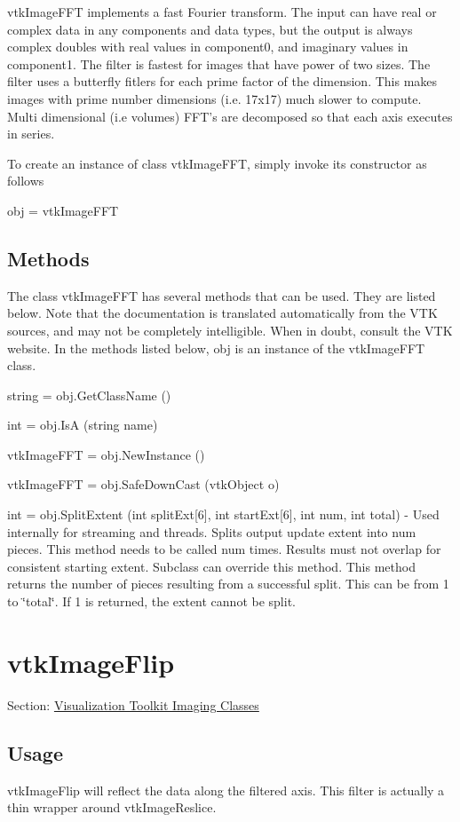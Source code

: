 vtk\-Image\-F\-F\-T implements a fast Fourier transform. The input can have real or complex data in any components and data types, but the output is always complex doubles with real values in component0, and imaginary values in component1. The filter is fastest for images that have power of two sizes. The filter uses a butterfly fitlers for each prime factor of the dimension. This makes images with prime number dimensions (i.\-e. 17x17) much slower to compute. Multi dimensional (i.\-e volumes) F\-F\-T's are decomposed so that each axis executes in series.

To create an instance of class vtk\-Image\-F\-F\-T, simply invoke its constructor as follows \begin{DoxyVerb}  obj = vtkImageFFT
\end{DoxyVerb}
 \hypertarget{vtkwidgets_vtkxyplotwidget_Methods}{}\subsection{Methods}\label{vtkwidgets_vtkxyplotwidget_Methods}
The class vtk\-Image\-F\-F\-T has several methods that can be used. They are listed below. Note that the documentation is translated automatically from the V\-T\-K sources, and may not be completely intelligible. When in doubt, consult the V\-T\-K website. In the methods listed below, {\ttfamily obj} is an instance of the vtk\-Image\-F\-F\-T class. 
\begin{DoxyItemize}
\item {\ttfamily string = obj.\-Get\-Class\-Name ()}  
\item {\ttfamily int = obj.\-Is\-A (string name)}  
\item {\ttfamily vtk\-Image\-F\-F\-T = obj.\-New\-Instance ()}  
\item {\ttfamily vtk\-Image\-F\-F\-T = obj.\-Safe\-Down\-Cast (vtk\-Object o)}  
\item {\ttfamily int = obj.\-Split\-Extent (int split\-Ext\mbox{[}6\mbox{]}, int start\-Ext\mbox{[}6\mbox{]}, int num, int total)} -\/ Used internally for streaming and threads. Splits output update extent into num pieces. This method needs to be called num times. Results must not overlap for consistent starting extent. Subclass can override this method. This method returns the number of pieces resulting from a successful split. This can be from 1 to \char`\"{}total\char`\"{}. If 1 is returned, the extent cannot be split.  
\end{DoxyItemize}\hypertarget{vtkimaging_vtkimageflip}{}\section{vtk\-Image\-Flip}\label{vtkimaging_vtkimageflip}
Section\-: \hyperlink{sec_vtkimaging}{Visualization Toolkit Imaging Classes} \hypertarget{vtkwidgets_vtkxyplotwidget_Usage}{}\subsection{Usage}\label{vtkwidgets_vtkxyplotwidget_Usage}
vtk\-Image\-Flip will reflect the data along the filtered axis. This filter is actually a thin wrapper around vtk\-Image\-Reslice.

